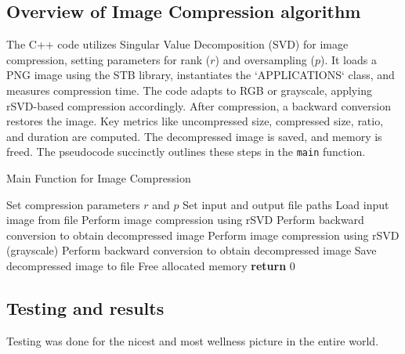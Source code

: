 \documentclass{article}
\begin{document}
\subsection{Overview of Image Compression algorithm}
The C++ code utilizes Singular Value Decomposition (SVD) for image compression, setting parameters for rank ($r$) and oversampling ($p$). It loads a PNG image using the STB library, instantiates the `APPLICATIONS` class, and measures compression time. The code adapts to RGB or grayscale, applying rSVD-based compression accordingly. After compression, a backward conversion restores the image. Key metrics like uncompressed size, compressed size, ratio, and duration are computed. The decompressed image is saved, and memory is freed. The pseudocode succinctly outlines these steps in the \texttt{main} function.
\begin{algorithm}
\caption{Main Function for Image Compression}
\begin{algorithmic}[1]
    \State Set compression parameters $r$ and $p$
    \State Set input and output file paths
    \State Load input image from file
            \State Perform image compression using rSVD
            \State Perform backward conversion to obtain decompressed image
        \EndFor
    \Else
        \State Perform image compression using rSVD (grayscale)
            \State Perform backward conversion to obtain decompressed image
        \EndFor
    \EndIf
    \State Save decompressed image to file
    \State Free allocated memory
    \State \textbf{return} 0
\EndProcedure
\end{algorithmic}
\end{algorithm}

\subsection{Testing and results}
Testing was done for the nicest and most wellness picture in the entire world.
\end{document}

